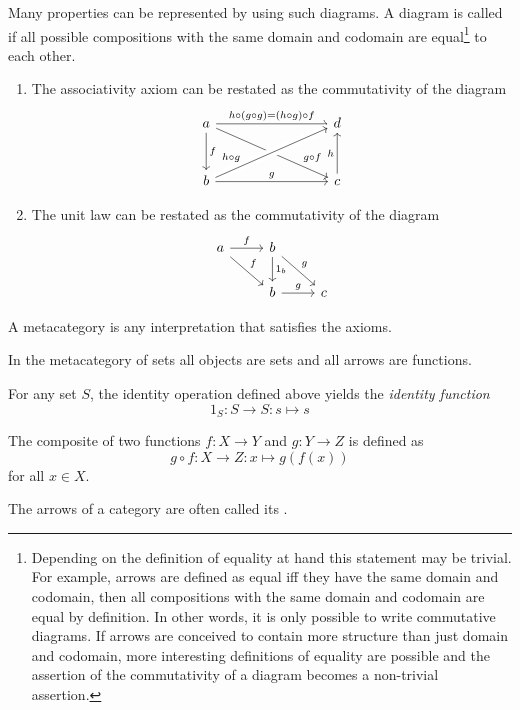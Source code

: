 Many properties can be represented by using such diagrams. A diagram is called  if all possible compositions with the same domain and codomain are equal\footnote{Depending on the definition of equality at hand this statement may be trivial. For example, arrows are defined as equal iff they have the same domain and codomain, then all compositions with the same domain and codomain are equal by definition. In other words, it is only possible to write commutative diagrams. If arrows are conceived to contain more structure than just domain and codomain, more interesting definitions of equality are possible and the assertion of the commutativity of a diagram becomes a non-trivial assertion.} to each other.

\begin{example}
\begin{enumerate}
\item The associativity axiom can be restated as the commutativity of the diagram
\[ \begin{tikzcd}[column sep=8em, row sep=large]
a \ar[r, "h\circ (g \circ g) = (h \circ g) \circ f"] \ar[d, "f"] \ar{dr}[near end]{g\circ f} & d \\
b \ar[crossing over]{ur}[near start]{h\circ g} \ar[r, "g"] & c \ar[u, "h"]
\end{tikzcd} \]
\item The unit law can be restated as the commutativity of the diagram
\[ \begin{tikzcd}
a \rar{f} \drar{f} & b \dar{1_b} \drar{g} & \\
& b \rar{g} & c
\end{tikzcd} \]
\end{enumerate}
\end{example}

A metacategory is any interpretation that satisfies the axioms.

\begin{example}
In the metacategory of sets all objects are sets and all arrows are functions.

For any set $S$, the identity operation defined above yields the \textit{identity function}
\[ 1_S: S\to S: s\mapsto s \]

The composite of two functions $f: X\to Y$ and $g: Y\to Z$ is defined as
\[ g\circ f: X \to Z: x\mapsto g(f(x)) \]
for all $x\in X$.
\end{example}

The arrows of a category are often called its .

